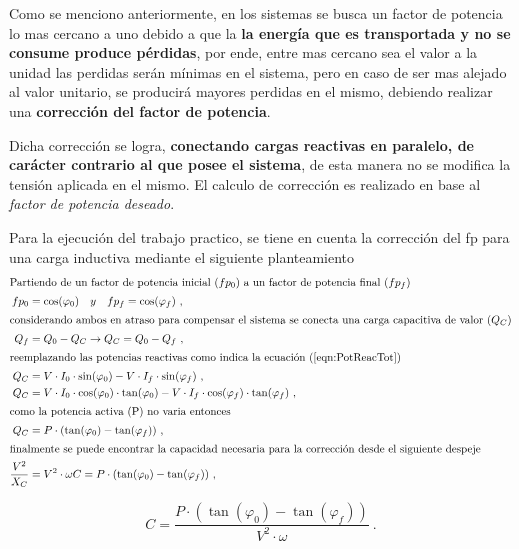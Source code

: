                Como se menciono anteriormente, en los sistemas se busca un factor de potencia 
               lo mas cercano a uno debido a que la \textbf{la energía que es transportada 
               y no se consume produce pérdidas}, por ende, entre mas cercano sea el valor a 
               la unidad las perdidas serán mínimas en el sistema, pero en caso de ser mas alejado 
               al valor unitario, se producirá mayores perdidas en el mismo, debiendo realizar
               una \textbf{corrección del factor de potencia}.

               Dicha corrección se logra, \textbf{conectando cargas reactivas en paralelo, 
               de carácter contrario al que posee el sistema}, de esta manera no se modifica 
               la tensión aplicada en el mismo. El calculo de corrección es realizado en base 
               al \textit{factor de potencia deseado}.
               
               Para la ejecución del trabajo practico, se tiene en cuenta la corrección del 
               fp para una carga inductiva mediante el siguiente planteamiento  
               \begin{align}
                  \intertext{Partiendo de un factor de potencia inicial (\(fp_0\)) a un factor
                  de potencia final (\(fp_f\)) }
                  fp_0  &= \cos(\varphi_0) \hspace{10pt} y \hspace{10pt} fp_f = \cos(\varphi_f) \ , \notag \\
                  \intertext{considerando ambos en atraso para compensar el sistema se 
                  conecta una carga capacitiva de valor (\(Q_C\))}
                  Q_f   &= Q_0 - Q_C \rightarrow Q_C = Q_0 - Q_f  \ , \notag \\
                  \intertext{reemplazando las potencias reactivas como indica la ecuación~(\ref{eqn:PotReacTot})}
                  Q_C   &= V\cdot I_0\cdot \sin(\varphi_0) - V\cdot I_f\cdot \sin(\varphi_f) \ , \notag \\ 
                  Q_C   &= V\cdot I_0\cdot \cos(\varphi_0)\cdot \tan(\varphi_0)  - V\cdot I_f\cdot \cos(\varphi_f)\cdot \tan(\varphi_f) \ , \notag \\
                  \intertext{como la potencia activa (P) no varia entonces}
                  Q_C   &= P\cdot (\tan(\varphi_0) - \tan(\varphi_f)) \ , \notag \\
                  \intertext{finalmente se puede encontrar la capacidad necesaria para la corrección desde el siguiente despeje}
                  \dfrac{V^{2}}{X_C}   &= V^{2}\cdot \omega C = P\cdot (\tan(\varphi_0) - \tan(\varphi_f))  \ , \notag
               \end{align}

                  \begin{equation}
                     \boxed{C = \dfrac{P\cdot (\tan(\varphi_0) - \tan(\varphi_f))}{V^{2}\cdot \omega}}~. \label{eqn:CorrecFp}
                  \end{equation}

      

               
               



							












